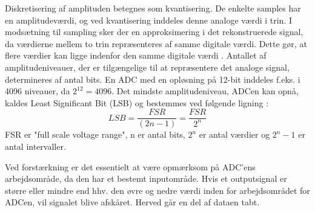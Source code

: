 Diskretisering af amplituden betegnes som kvantisering. De enkelte samples har en amplitudeværdi, og ved kvantisering inddeles denne analoge værdi i trin. I modsætning til sampling sker der en approksimering i det rekonstruerede signal, da værdierne mellem to trin repræsenteres af samme digitale værdi. Dette gør, at flere værdier kan ligge indenfor den samme digitale værdi \cite{Zouridakis2003}. Antallet af amplitudeniveauer, der er tilgængelige til at repræsentere det analoge signal, determineres af antal bits. En ADC med en opløsning på 12-bit inddeles f.eks. i 4096 niveauer, da $2^{12}=4096$. \cite{Konrad2006} Det mindste amplitudeniveau, ADCen kan opnå, kaldes Least Significant Bit (LSB) og bestemmes ved følgende ligning :
\begin{equation}\label{ligningLSB}
LSB = \frac{FSR}{(2n-1)} = \frac{FSR}{2^{n}}
\end{equation}
FSR er "full scale voltage range", n er antal bits, $2^n$ er antal værdier og $2^{n}-1$ er antal intervaller. 

Ved forstærkning er det essentielt at være opmærksom på ADC'ens arbejdsområde, da den har et bestemt inputområde. Hvis et outputsignal er større eller mindre end hhv. den øvre og nedre værdi inden for arbejdsområdet for ADCen, vil signalet blive afskåret. Herved går en del af dataen tabt.  